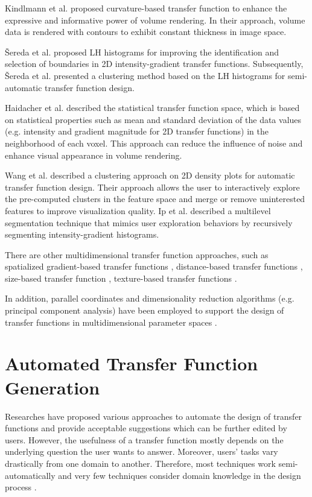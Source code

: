 Kindlmann et al. \cite{kindlmann_curvature-based_2003} proposed curvature-based transfer function to enhance the expressive and informative power of volume rendering. In their approach, volume data is rendered with contours to exhibit constant thickness in image space.

{\v S}ereda et al. \cite{sereda_visualization_2006} proposed LH histograms for improving the identification and selection of boundaries in 2D intensity-gradient transfer functions. Subsequently, {\v S}ereda et al. \cite{sereda_automating_2006} presented a clustering method based on the LH histograms for semi-automatic transfer function design.

Haidacher et al. \cite{haidacher_volume_2010} described the statistical transfer function space, which is based on statistical properties such as mean and standard deviation of the data values (e.g. intensity and gradient magnitude for 2D transfer functions) in the neighborhood of each voxel. This approach can reduce the influence of noise and enhance visual appearance in volume rendering.

Wang et al. \cite{wang_automating_2012} described a clustering approach on 2D density plots for automatic transfer function design. Their approach allows the user to interactively explore the pre-computed clusters in the feature space and merge or remove uninterested features to improve visualization quality.
Ip et al. \cite{ip_hierarchical_2012} described a multilevel segmentation technique that mimics user exploration behaviors by recursively segmenting intensity-gradient histograms.

There are other multidimensional transfer function approaches, such as spatialized gradient-based transfer functions \cite{roettger_spatialized_2005}, distance-based transfer functions \cite{tappenbeck_distance-based_2006}, size-based transfer function \cite{correa_size-based_2008}, texture-based transfer functions \cite{caban_texture-based_2008} \cite{alper_selver_exploring_2015}.

In addition, parallel coordinates and dimensionality reduction algorithms (e.g. principal component analysis) have been employed to support the design of transfer functions in multidimensional parameter spaces \cite{zhao_multi-dimensional_2010} \cite{guo_multi-dimensional_2011} \cite{kim_dimensionality_2010}.

\section{Automated Transfer Function Generation}
Researches have proposed various approaches to automate the design of transfer functions and provide acceptable suggestions which can be further edited by users. However, the usefulness of a transfer function mostly depends on the underlying question the user wants to answer. Moreover, users' tasks vary drastically from one domain to another. Therefore, most techniques work semi-automatically and very few techniques consider domain knowledge in the design process \cite{zudilova-seinstra_trends_2008}.

